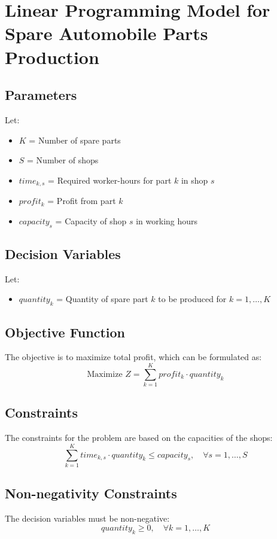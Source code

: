 \documentclass{article}
\begin{document}
\section*{Linear Programming Model for Spare Automobile Parts Production}

\subsection*{Parameters}
Let:
\begin{itemize}
    \item $K$ = Number of spare parts
    \item $S$ = Number of shops
    \item $time_{k,s}$ = Required worker-hours for part $k$ in shop $s$
    \item $profit_k$ = Profit from part $k$
    \item $capacity_s$ = Capacity of shop $s$ in working hours
\end{itemize}

\subsection*{Decision Variables}
Let:
\begin{itemize}
    \item $quantity_k$ = Quantity of spare part $k$ to be produced for $k = 1, \ldots, K$
\end{itemize}

\subsection*{Objective Function}
The objective is to maximize total profit, which can be formulated as:
\[
\text{Maximize } Z = \sum_{k=1}^{K} profit_k \cdot quantity_k
\]

\subsection*{Constraints}
The constraints for the problem are based on the capacities of the shops:
\[
\sum_{k=1}^{K} time_{k,s} \cdot quantity_k \leq capacity_s, \quad \forall s = 1, \ldots, S
\]

\subsection*{Non-negativity Constraints}
The decision variables must be non-negative:
\[
quantity_k \geq 0, \quad \forall k = 1, \ldots, K
\]
\end{document}
